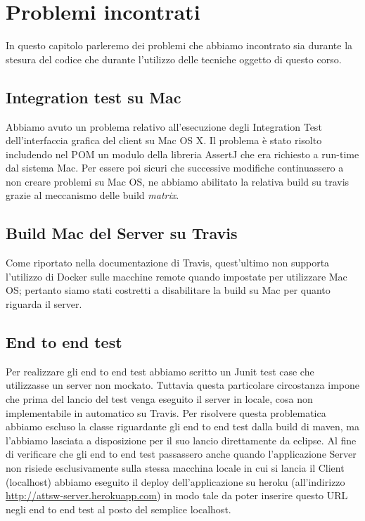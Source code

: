 \chapter{Problemi incontrati}
In questo capitolo parleremo dei problemi che abbiamo incontrato sia durante la stesura del codice che durante l'utilizzo delle tecniche oggetto di questo corso.
\section{Integration test su Mac}
Abbiamo avuto un problema relativo all'esecuzione degli Integration Test dell'interfaccia grafica del client su Mac OS X. Il problema \`e stato risolto includendo nel POM un modulo della libreria AssertJ che era richiesto a run-time dal sistema Mac. Per essere poi sicuri che successive modifiche continuassero a non creare problemi su Mac OS, ne abbiamo abilitato la relativa build su travis grazie al meccanismo delle build \emph{matrix}.
\section{Build Mac del Server su Travis}
Come riportato nella documentazione di Travis, quest'ultimo non supporta l'utilizzo di Docker sulle macchine remote quando impostate per utilizzare Mac OS; pertanto siamo stati costretti a disabilitare la build su Mac per quanto riguarda il server.
\section{End to end test}
Per realizzare gli end to end test abbiamo scritto un Junit test case che utilizzasse un server non mockato. Tuttavia questa particolare circostanza impone che prima del lancio del test venga eseguito il server in locale, cosa non implementabile in automatico su Travis. Per risolvere questa problematica abbiamo escluso la classe riguardante gli end to end test dalla build di maven, ma l'abbiamo lasciata a disposizione per il suo lancio direttamente da eclipse. Al fine di verificare che gli end to end test passassero anche quando l'applicazione Server non risiede esclusivamente sulla stessa macchina locale in cui si lancia il Client (localhost) abbiamo eseguito il deploy dell'applicazione su heroku (all'indirizzo \url{http://attsw-server.herokuapp.com}) in modo tale da poter inserire questo URL negli end to end test al posto del semplice localhost.
